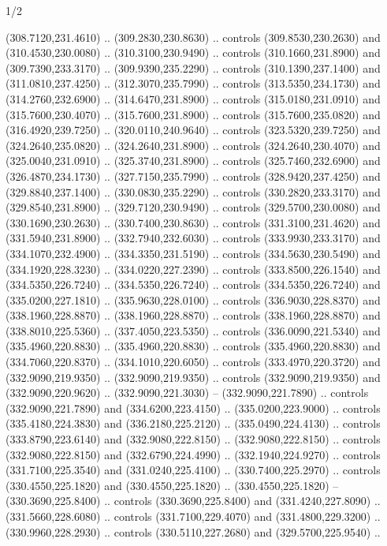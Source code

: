 \begin{flagdescription}{1/2}
\begin{scope}[xshift=0.5\flaglength]
\begin{scope}[scale=0.004\flagwidth,xshift=-90mm,yshift=89mm]
\begin{scope}[y=0.80pt, x=0.80pt, yscale=-1, xscale=1, inner sep=0pt, outer sep=0pt]
  (308.7120,231.4610) .. (309.2830,230.8630) .. controls (309.8530,230.2630) and
  (310.4530,230.0080) .. (310.3100,230.9490) .. controls (310.1660,231.8900) and
  (309.7390,233.3170) .. (309.9390,235.2290) .. controls (310.1390,237.1400) and
  (311.0810,237.4250) .. (312.3070,235.7990) .. controls (313.5350,234.1730) and
  (314.2760,232.6900) .. (314.6470,231.8900) .. controls (315.0180,231.0910) and
  (315.7600,230.4070) .. (315.7600,231.8900) .. controls (315.7600,235.0820) and
  (316.4920,239.7250) .. (320.0110,240.9640) .. controls (323.5320,239.7250) and
  (324.2640,235.0820) .. (324.2640,231.8900) .. controls (324.2640,230.4070) and
  (325.0040,231.0910) .. (325.3740,231.8900) .. controls (325.7460,232.6900) and
  (326.4870,234.1730) .. (327.7150,235.7990) .. controls (328.9420,237.4250) and
  (329.8840,237.1400) .. (330.0830,235.2290) .. controls (330.2820,233.3170) and
  (329.8540,231.8900) .. (329.7120,230.9490) .. controls (329.5700,230.0080) and
  (330.1690,230.2630) .. (330.7400,230.8630) .. controls (331.3100,231.4620) and
  (331.5940,231.8900) .. (332.7940,232.6030) .. controls (333.9930,233.3170) and
  (334.1070,232.4900) .. (334.3350,231.5190) .. controls (334.5630,230.5490) and
  (334.1920,228.3230) .. (334.0220,227.2390) .. controls (333.8500,226.1540) and
  (334.5350,226.7240) .. (334.5350,226.7240) .. controls (334.5350,226.7240) and
  (335.0200,227.1810) .. (335.9630,228.0100) .. controls (336.9030,228.8370) and
  (338.1960,228.8870) .. (338.1960,228.8870) .. controls (338.1960,228.8870) and
  (338.8010,225.5360) .. (337.4050,223.5350) .. controls (336.0090,221.5340) and
  (335.4960,220.8830) .. (335.4960,220.8830) .. controls (335.4960,220.8830) and
  (334.7060,220.8370) .. (334.1010,220.6050) .. controls (333.4970,220.3720) and
  (332.9090,219.9350) .. (332.9090,219.9350) .. controls (332.9090,219.9350) and
  (332.9090,220.9620) .. (332.9090,221.3030) -- (332.9090,221.7890) .. controls
  (332.9090,221.7890) and (334.6200,223.4150) .. (335.0200,223.9000) .. controls
  (335.4180,224.3830) and (336.2180,225.2120) .. (335.0490,224.4130) .. controls
  (333.8790,223.6140) and (332.9080,222.8150) .. (332.9080,222.8150) .. controls
  (332.9080,222.8150) and (332.6790,224.4990) .. (332.1940,224.9270) .. controls
  (331.7100,225.3540) and (331.0240,225.4100) .. (330.7400,225.2970) .. controls
  (330.4550,225.1820) and (330.4550,225.1820) .. (330.4550,225.1820) --
  (330.3690,225.8400) .. controls (330.3690,225.8400) and (331.4240,227.8090) ..
  (331.5660,228.6080) .. controls (331.7100,229.4070) and (331.4800,229.3200) ..
  (330.9960,228.2930) .. controls (330.5110,227.2680) and (329.5700,225.9540) ..

\end{scope}
\end{scope}
\end{scope}
\end{flagdescription}
